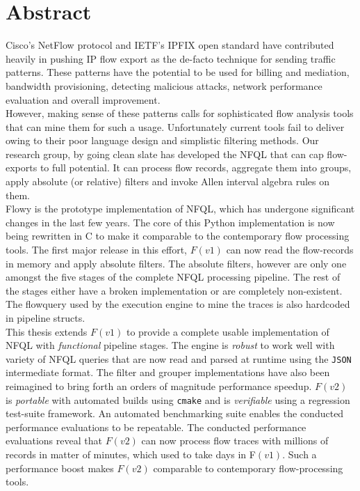 \begingroup
\let\clearpage\relax
\let\cleardoublepage\relax
\let\cleardoublepage\relax
\chapter*{Abstract}

Cisco's NetFlow protocol \cite{rfc3954} and \ac{IETF}'s \ac{IPFIX}
\cite{rfc5101} open standard have contributed heavily in pushing \ac{IP} flow
export as the de-facto technique for sending traffic patterns. These patterns
have the potential to be used for billing and mediation, bandwidth
provisioning, detecting malicious attacks, network performance evaluation and
overall improvement. \\

However, making sense of these patterns calls for sophisticated flow analysis
tools that can mine them for such a usage. Unfortunately current tools fail to
deliver owing to their poor language design and simplistic filtering methods.
Our research group, by going clean slate has developed the \ac{NFQL}
\cite{vmarinov:thesis:2009} that can cap flow-exports to full potential. It can
process flow records, aggregate them into groups, apply absolute (or relative)
filters and invoke Allen interval algebra rules \cite{fallen:1983} on them. \\

Flowy \cite{kkanev:thesis:2009} is the prototype implementation of \ac{NFQL},
which has undergone significant changes in the last few years.  The core of
this Python implementation is now being rewritten in C to make it comparable
to the contemporary flow processing tools. The first major release in this
effort, $F(v1)$ \cite{jschauer:thesis:2011} can now read the flow-records in
memory and apply absolute filters. The absolute filters, however are only one
amongst the five stages of the complete \ac{NFQL} processing pipeline. The
rest of the stages either have a broken implementation or are completely
non-existent. The flowquery used by the execution engine to mine the traces
is also hardcoded in pipeline structs. \\

This thesis extends $F(v1)$ to provide a complete usable implementation of
\ac{NFQL} with \emph{functional} pipeline stages. The engine is \emph{robust}
to work well with variety of \ac{NFQL} queries that are now read and parsed at
runtime using the \texttt{JSON} intermediate format. The filter and grouper
implementations have also been reimagined to bring forth an orders of
magnitude performance speedup. $F(v2)$ is \emph{portable} with automated
builds using \texttt{cmake} and is \emph{verifiable} using a regression
test-suite framework. An automated benchmarking suite enables the conducted
performance evaluations to be repeatable. The conducted performance
evaluations reveal that $F(v2)$ can now process flow traces with millions of
records in matter of minutes, which used to take days in F$(v1)$. Such a
performance boost makes $F(v2)$ comparable to contemporary flow-processing
tools.

